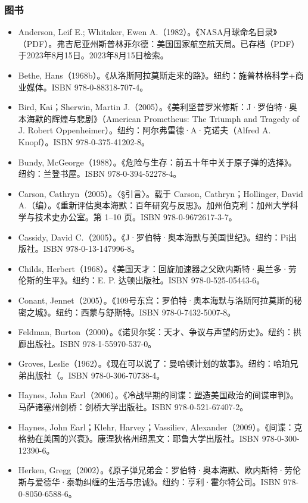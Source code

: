 \subsubsection{图书}
\begin{itemize}
\item Anderson, Leif E.; Whitaker, Ewen A.（1982）。《NASA月球命名目录》（PDF）。弗吉尼亚州斯普林菲尔德：美国国家航空航天局。已存档（PDF）于2023年8月15日。2023年8月15日检索。
\item Bethe, Hans（1968b）。《从洛斯阿拉莫斯走来的路》。纽约：施普林格科学+商业媒体。ISBN 978-0-88318-707-4。
\item Bird, Kai；Sherwin, Martin J.（2005）。《美利坚普罗米修斯：J·罗伯特·奥本海默的辉煌与悲剧》（American Prometheus: The Triumph and Tragedy of J. Robert Oppenheimer）。纽约：阿尔弗雷德·A·克诺夫（Alfred A. Knopf）。ISBN 978-0-375-41202-8。
\item Bundy, McGeorge（1988）。《危险与生存：前五十年中关于原子弹的选择》。纽约：兰登书屋。ISBN 978-0-394-52278-4。
\item Carson, Cathryn（2005）。〈§引言〉。载于 Carson, Cathryn；Hollinger, David A.（编）。《重新评估奥本海默：百年研究与反思》。加州伯克利：加州大学科学与技术史办公室。第 1–10 页。ISBN 978-0-9672617-3-7。
\item Cassidy, David C.（2005）。《J·罗伯特·奥本海默与美国世纪》。纽约：Pi出版社。ISBN 978-0-13-147996-8。
\item Childs, Herbert（1968）。《美国天才：回旋加速器之父欧内斯特·奥兰多·劳伦斯的生平》。纽约：E. P. 达顿出版社。ISBN 978-0-525-05443-6。
\item Conant, Jennet（2005）。《109号东宫：罗伯特·奥本海默与洛斯阿拉莫斯的秘密之城》。纽约：西蒙与舒斯特。ISBN 978-0-7432-5007-8。
\item Feldman, Burton（2000）。《诺贝尔奖：天才、争议与声望的历史》。纽约：拱廊出版社。ISBN 978-1-55970-537-0。
\item Groves, Leslie（1962）。《现在可以说了：曼哈顿计划的故事》。纽约：哈珀兄弟出版社（。ISBN 978-0-306-70738-4。
\item Haynes, John Earl（2006）。《冷战早期的间谍：塑造美国政治的间谍审判》。马萨诸塞州剑桥：剑桥大学出版社。ISBN 978-0-521-67407-2。
\item Haynes, John Earl；Klehr, Harvey；Vassiliev, Alexander（2009）。《间谍：克格勃在美国的兴衰》。康涅狄格州纽黑文：耶鲁大学出版社。ISBN 978-0-300-12390-6。
\item Herken, Gregg（2002）。《原子弹兄弟会：罗伯特·奥本海默、欧内斯特·劳伦斯与爱德华·泰勒纠缠的生活与忠诚》。纽约：亨利·霍尔特公司。ISBN 978-0-8050-6588-6。

\end{itemize}
